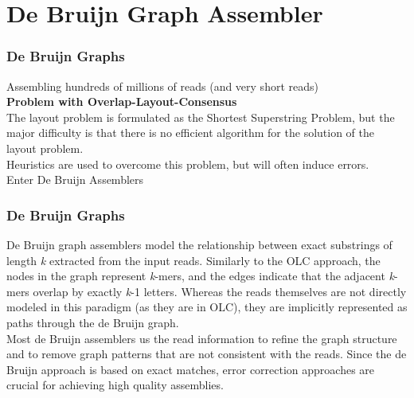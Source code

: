 \documentclass[pdf]{beamer}
\begin{document}
\section{De Bruijn Graph Assembler}
\begin{frame}
\frametitle{De Bruijn Graphs}
Assembling hundreds of millions of reads (and very short reads)\\
\vspace{0.2in}
\textbf{Problem with Overlap-Layout-Consensus}\\
The layout problem is formulated as the Shortest Superstring Problem, but the major difficulty is that there is no efficient algorithm for the solution of the layout problem.\\
\vspace{0.2in}
Heuristics are used to overcome this problem, but will often induce errors.\\
\vspace{0.1in}
Enter De Bruijn Assemblers
\end{frame}

\begin{frame}
\frametitle{De Bruijn Graphs}
De Bruijn graph assemblers model the relationship between exact substrings of length \textit{k} extracted from the input reads. Similarly to the OLC approach, the nodes in the graph represent \textit{k}-mers, and the edges indicate that the adjacent \textit{k}-mers overlap by exactly \textit{k}-1 letters. Whereas the reads themselves are not directly modeled in this paradigm (as they are in OLC), they are implicitly represented as paths through the de Bruijn graph.\\
\vspace{0.1in}
Most de Bruijn assemblers us the read information to refine the graph structure and to remove graph patterns that are not consistent with the reads. Since the de Bruijn approach is based on exact matches, error correction approaches are crucial for achieving high quality assemblies.
\end{frame}
\end{document}
